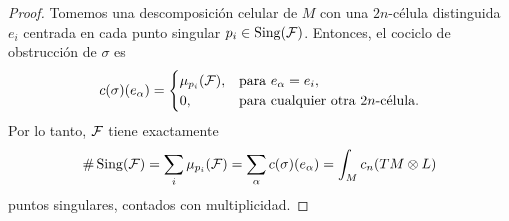 \begin{proof}
Tomemos una descomposición celular de $M$ con una $2n$-célula distinguida $e_i$ centrada en cada punto singular $p_i \in \operatorname{Sing}(\mathcal F)$. Entonces, el cociclo de obstrucción de $\sigma$ es
$$
c(\sigma)(e_\alpha) =
    \begin{cases}
        \mu_{p_i}(\mathcal F), & \text{para } e_\alpha = e_i, \\
        0,             & \text{para cualquier otra $2n$-célula.}
    \end{cases}
$$
Por lo tanto, $\mathcal F$ tiene exactamente
$$\# \operatorname{Sing}(\mathcal F) = \sum_i \mu_{p_i}(\mathcal F) = \sum_\alpha c(\sigma)(e_\alpha) = \int_M c_n(TM \otimes L)$$
puntos singulares, contados con multiplicidad.
\end{proof}


